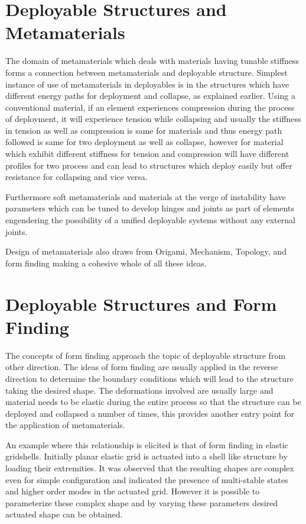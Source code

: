 \section{Deployable Structures and Metamaterials}
The domain of metamaterials which deals with materials having tunable stiffness forms a connection between metamaterials and deployable structure. Simplest instance of use of metamaterials in deployables is in the structures which have different energy paths for deployment and collapse, as explained earlier. Using a conventional material, if an element experiences compression during the process of deployment, it will experience tension while collapsing and usually the stiffness in tension as well as compression is same for materials and thus energy path followed is same for two deployment as well as collapse, however for material which exhibit different stiffness for tension and compression will have different profiles for two process and can lead to structures which deploy easily but offer resistance for collapsing and vice versa.\cite{Zha} 

Furthermore soft metamaterials and materials at the verge of instability have parameters which can be tuned to develop hinges and joints as part of elements engendering the possibility of a unified deployable systems without any external joints.\cite{Baardink489, Rock}

Design of metamaterials also draws from Origami, Mechanism, Topology, and form finding making a cohesive whole of all these ideas\cite{Filip, Rock}.


\section{Deployable Structures and Form Finding}
The concepts of form finding approach the topic of deployable structure from other direction. The ideas of form finding are usually applied in the reverse direction to determine the boundary conditions which will lead to the structure taking the desired shape. The deformations involved are usually large and material needs to be elastic during the entire process so that the structure can be deployed and collapsed a number of times, this provides another entry point for the application of metamaterials.

An example where this relationship is elicited is that of form finding in elastic gridshells. Initially planar elastic grid is actuated into a shell like structure by loading their extremities. It was observed that the resulting shapes are complex even for simple configuration and indicated the presence of multi-stable states and higher order modes in the actuated grid. However it is possible to parameterize these complex shape and by varying these parameters desired actuated shape can be obtained\cite{Baek75}.

